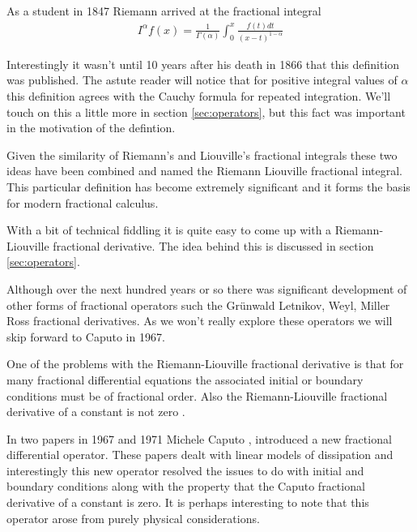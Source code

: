 As a student in 1847 Riemann arrived at the fractional integral
\begin{align*}
	I^\alpha f(x) = \frac{1}{\Gamma(\alpha)} \int_0^x \frac{f(t)dt}{(x-t)^{1-\alpha}}
\end{align*}

Interestingly it wasn't until 10 years after his death in 1866 that this definition was published. The astute reader will notice that for positive integral values of $ \alpha $ this definition agrees with the Cauchy formula for repeated integration. We'll touch on this a little more in section \ref{sec:operators}, but this fact was important in the motivation of the defintion.

Given the similarity of Riemann's and Liouville's fractional integrals these two ideas have been combined and named the Riemann Liouville fractional integral. This particular definition has become extremely significant and it forms the basis for modern fractional calculus. 

With a bit of technical fiddling it is quite easy to come up with a Riemann-Liouville fractional derivative. The idea behind this is discussed in section \ref{sec:operators}.

Although over the next hundred years or so there was significant development of other forms of fractional operators such the Gr{\"u}nwald Letnikov, Weyl, Miller Ross fractional derivatives. As we won't really explore these operators we will skip forward to Caputo in 1967. 

One of the problems with the Riemann-Liouville fractional derivative is that for many fractional differential equations the associated initial or boundary conditions must be of fractional order. Also the Riemann-Liouville fractional derivative of a constant is not zero \cite{Podlubny1999}. 

In two papers in 1967 and 1971 Michele Caputo\cite{Caputo1967} \cite{Caputo1971}, introduced a new fractional differential operator. These papers dealt with linear models of dissipation and interestingly this new operator resolved the issues to do with initial and boundary conditions along with the property that the Caputo fractional derivative of a constant is zero. It is perhaps interesting to note that this operator arose from purely physical considerations. 

\clearpage
